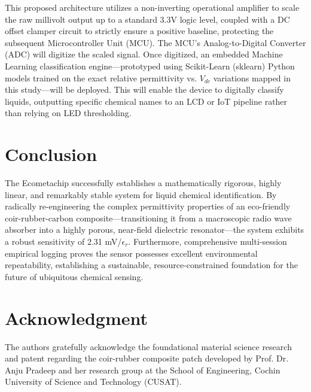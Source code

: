 \documentclass[11pt, a4paper]{article}
\begin{document}
This proposed architecture utilizes a non-inverting operational amplifier to scale the raw millivolt output up to a standard 3.3V logic level, coupled with a DC offset clamper circuit to strictly ensure a positive baseline, protecting the subsequent Microcontroller Unit (MCU). The MCU's Analog-to-Digital Converter (ADC) will digitize the scaled signal. Once digitized, an embedded Machine Learning classification engine---prototyped using Scikit-Learn (sklearn) Python models trained on the exact relative permittivity vs. $V_{dc}$ variations mapped in this study---will be deployed. This will enable the device to digitally classify liquids, outputting specific chemical names to an LCD or IoT pipeline rather than relying on LED thresholding.

\section{Conclusion}
The Ecometachip successfully establishes a mathematically rigorous, highly linear, and remarkably stable system for liquid chemical identification. By radically re-engineering the complex permittivity properties of an eco-friendly coir-rubber-carbon composite---transitioning it from a macroscopic radio wave absorber into a highly porous, near-field dielectric resonator---the system exhibits a robust sensitivity of 2.31 mV/$\epsilon_r$. Furthermore, comprehensive multi-session empirical logging proves the sensor possesses excellent environmental repeatability, establishing a sustainable, resource-constrained foundation for the future of ubiquitous chemical sensing.

\vspace*{10pt}
\section*{Acknowledgment}
The authors gratefully acknowledge the foundational material science research and patent regarding the coir-rubber composite patch developed by Prof. Dr. Anju Pradeep and her research group at the School of Engineering, Cochin University of Science and Technology (CUSAT).
\end{document}
